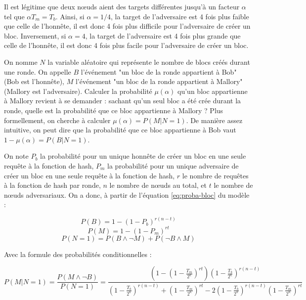 	Il est légitime que deux nœuds aient des targets différentes jusqu'à un
	facteur $\alpha$ tel que $\alpha T_m = T_b$. Ainsi, si $\alpha = 1/4$, la
	target de l'adversaire est 4 fois plus faible que celle de l'honnête, il est
	donc 4 fois plus difficile pour l'adversaire de créer un bloc. Inversement, si
	$\alpha = 4$, la target de l'adversaire est 4 fois plus grande que celle de
	l'honnête, il est donc 4 fois plus facile pour l'adversaire de créer un bloc.

	On nomme $N$ la variable aléatoire qui représente le nombre de blocs créés
	durant une ronde. On appelle $B$ l'événement "un bloc de la ronde appartient à
	Bob" (Bob est l'honnête), $M$ l'événement "un bloc de la ronde appartient à
	Mallory" (Mallory est l'adversaire). Calculer la probabilité $\mu(\alpha)$
	qu'un bloc appartienne à Mallory revient à se demander : sachant qu'un seul
	bloc a été crée durant la ronde, quelle est la probabilité que ce bloc
	appartienne à Mallory ? Plus formellement, on cherche à calculer $\mu(\alpha)
	= P(M | N=1)$. De manière assez intuitive, on peut dire que la probabilité que
	ce bloc appartienne à Bob vaut $1 - \mu(\alpha) = P(B | N=1)$.


	On note  $P_b$ la probabilité pour un unique honnête de créer un bloc en une
	seule requête à la fonction de hash, $P_m$ la probabilité pour un unique
	adversaire de créer un bloc en une seule requête à la fonction de hash, $r$ le
	nombre de requêtes à la fonction de hash par ronde, $n$ le nombre de nœuds
	au total, et $t$ le nombre de nœuds adversariaux. On a donc, à partir de
	l'équation \ref{eq:proba-bloc} du modèle :
	
	\begin{equation}
		P(B) = 1 - (1 - P_b)^{r(n-t)}
	\end{equation}
	\begin{equation}
		P(M) = 1 - (1 - P_m)^{rt}
	\end{equation}
	\begin{equation}
		P(N=1) = P(B \land \neg M) + P(\neg B \land M)
	\end{equation}

	Avec la formule des probabilités conditionnelles :

	\begin{equation}
		P(M | N=1)
		= \frac{P(M \land \neg B)}{P(N=1)}
			  = \frac{
					(1 - (1 - \frac{T_m}{2^\kappa})^{rt})(1 - \frac{T_b}{2^\kappa})^{r(n-t)}
				}
				{
					(1 - \frac{T_b}{2^\kappa})^{r(n-t)} 
					+ (1 - \frac{T_m}{2^\kappa})^{rt} 
					- 2(1 - \frac{T_b}{2^\kappa})^{r(n-t)}(1 - \frac{T_m}{2^\kappa})^{rt}
				}
	\label{eq:m_sachant_n}
	\end{equation}

